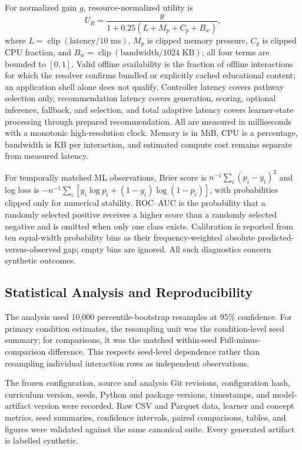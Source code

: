\documentclass[conference]{IEEEtran}
\begin{document}
For normalized gain $g$, resource-normalized utility is
\begin{equation}
U_R=\frac{g}{1+0.25(L+M_p+C_p+B_w)},
\end{equation}
where $L=\operatorname{clip}(\text{latency}/10\text{ ms})$, $M_p$ is clipped
memory pressure, $C_p$ is clipped CPU fraction, and
$B_w=\operatorname{clip}(\text{bandwidth}/1024\text{ KB})$; all four terms are
bounded to $[0,1]$. Valid offline availability is the fraction of offline
interactions for which the resolver confirms bundled or explicitly cached
educational content; an application shell alone does not qualify. Controller
latency covers pathway selection only, recommendation latency covers
generation, scoring, optional inference, fallback, and selection, and total
adaptive latency covers learner-state processing through prepared
recommendation. All are measured in milliseconds with a monotonic
high-resolution clock. Memory is in MiB, CPU is a percentage, bandwidth is KB
per interaction, and estimated compute cost remains separate from measured
latency.

For temporally matched ML observations, Brier score is
$n^{-1}\sum_i(p_i-y_i)^2$ and log loss is
$-n^{-1}\sum_i[y_i\log p_i+(1-y_i)\log(1-p_i)]$, with probabilities clipped
only for numerical stability. ROC--AUC is the probability that a randomly
selected positive receives a higher score than a randomly selected negative
and is omitted when only one class exists. Calibration is reported from
ten equal-width probability bins as their frequency-weighted absolute
predicted-versus-observed gap; empty bins are ignored. All such
diagnostics concern synthetic outcomes.

\subsection{Statistical Analysis and Reproducibility}

The analysis used 10,000 percentile-bootstrap resamples at 95\% confidence.
For primary condition estimates, the resampling unit was the condition-level
seed summary; for comparisons, it was the matched within-seed Full-minus-
comparison difference. This respects seed-level dependence rather than
resampling individual interaction rows as independent observations.

The frozen configuration, source and analysis Git revisions, configuration
hash, curriculum version, seeds, Python and package versions, timestamps, and
model-artifact version were recorded. Raw CSV and Parquet data, learner and
concept metrics, seed summaries, confidence intervals, paired comparisons,
tables, and figures were validated against the same canonical suite. Every
generated artifact is labelled synthetic.
\end{document}
